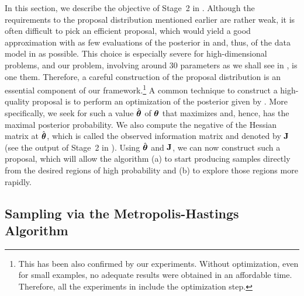 In this section, we describe the objective of Stage~2 in .
Although the requirements to the proposal distribution mentioned earlier are
rather weak, it is often difficult to pick an efficient proposal, which would
yield a good approximation with as few evaluations of the posterior in
 and, thus, of the data model in  as possible.
This choice is especially severe for high-dimensional problems, and our problem,
involving around 30 parameters as we shall see in ,
is one them. Therefore, a careful construction of the proposal distribution is
an essential component of our framework.\footnote{This has been also confirmed
by our experiments. Without optimization, even for small examples, no adequate
results were obtained in an affordable time. Therefore, all the experiments in
 include the optimization step.} A common technique
to construct a high-quality proposal is to perform an optimization of the
posterior given by . More specifically, we seek for such a value
$\hat{\boldsymbol{\theta}}$ of $\boldsymbol{\theta}$ that maximizes  and, hence, has the maximal
posterior probability. We also compute the negative of the Hessian matrix at
$\hat{\boldsymbol{\theta}}$, which is called the observed information matrix and denoted by
$\mathbf{J}$ (see the output of Stage~2 in ). Using $\hat{\boldsymbol{\theta}}$ and
$\mathbf{J}$, we can now construct such a proposal, which will allow the 
algorithm (a) to start producing samples directly from the desired regions of
high probability and (b) to explore those regions more rapidly.

\subsection{Sampling via the Metropolis-Hastings Algorithm}

